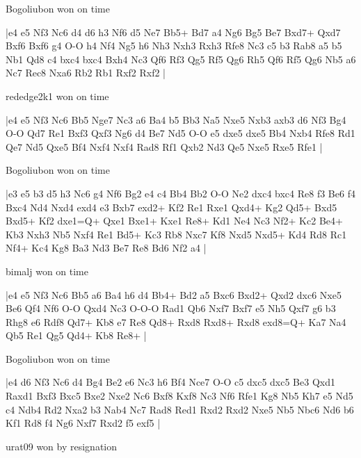 \showboard

Bogoliubon won on time

\makegametitle
|e4 e5 Nf3 Nc6 d4 d6 h3 Nf6 d5 Ne7 Bb5+ Bd7 a4 Ng6 Bg5 Be7 Bxd7+ Qxd7 Bxf6 Bxf6 g4 O-O h4 Nf4 Ng5 h6 Nh3 Nxh3 Rxh3 Rfe8 Nc3 c5 b3 Rab8 a5 b5 Nb1 Qd8 c4 bxc4 bxc4 Bxh4 Nc3 Qf6 Rf3 Qg5 Rf5 Qg6 Rh5 Qf6 Rf5 Qg6 Nb5 a6 Nc7 Rec8 Nxa6 Rb2 Rb1 Rxf2 Rxf2  |

\showboard

rededge2k1 won on time

\makegametitle
|e4 e5 Nf3 Nc6 Bb5 Nge7 Nc3 a6 Ba4 b5 Bb3 Na5 Nxe5 Nxb3 axb3 d6 Nf3 Bg4 O-O Qd7 Re1 Bxf3 Qxf3 Ng6 d4 Be7 Nd5 O-O e5 dxe5 dxe5 Bb4 Nxb4 Rfe8 Rd1 Qe7 Nd5 Qxe5 Bf4 Nxf4 Nxf4 Rad8 Rf1 Qxb2 Nd3 Qe5 Nxe5 Rxe5 Rfe1  |

\showboard

Bogoliubon won on time

\makegametitle
|e3 e5 b3 d5 h3 Nc6 g4 Nf6 Bg2 e4 c4 Bb4 Bb2 O-O Ne2 dxc4 bxc4 Re8 f3 Be6 f4 Bxc4 Nd4 Nxd4 exd4 e3 Bxb7 exd2+ Kf2 Re1 Rxe1 Qxd4+ Kg2 Qd5+ Bxd5 Bxd5+ Kf2 dxe1=Q+ Qxe1 Bxe1+ Kxe1 Re8+ Kd1 Ne4 Nc3 Nf2+ Kc2 Be4+ Kb3 Nxh3 Nb5 Nxf4 Re1 Bd5+ Kc3 Rb8 Nxc7 Kf8 Nxd5 Nxd5+ Kd4 Rd8 Rc1 Nf4+ Kc4 Kg8 Ba3 Nd3 Be7 Re8 Bd6 Nf2 a4  |

\showboard

bimalj won on time

\makegametitle
|e4 e5 Nf3 Nc6 Bb5 a6 Ba4 h6 d4 Bb4+ Bd2 a5 Bxc6 Bxd2+ Qxd2 dxc6 Nxe5 Be6 Qf4 Nf6 O-O Qxd4 Nc3 O-O-O Rad1 Qb6 Nxf7 Bxf7 e5 Nh5 Qxf7 g6 b3 Rhg8 e6 Rdf8 Qd7+ Kb8 e7 Re8 Qd8+ Rxd8 Rxd8+ Rxd8 exd8=Q+ Ka7 Na4 Qb5 Re1 Qg5 Qd4+ Kb8 Re8+  |

\showboard

Bogoliubon won on time

\makegametitle
|e4 d6 Nf3 Nc6 d4 Bg4 Be2 e6 Nc3 h6 Bf4 Nce7 O-O c5 dxc5 dxc5 Be3 Qxd1 Raxd1 Bxf3 Bxc5 Bxe2 Nxe2 Nc6 Bxf8 Kxf8 Nc3 Nf6 Rfe1 Kg8 Nb5 Kh7 e5 Nd5 c4 Ndb4 Rd2 Nxa2 b3 Nab4 Nc7 Rad8 Red1 Rxd2 Rxd2 Nxe5 Nb5 Nbc6 Nd6 b6 Kf1 Rd8 f4 Ng6 Nxf7 Rxd2 f5 exf5  |

\showboard

urat09 won by resignation

